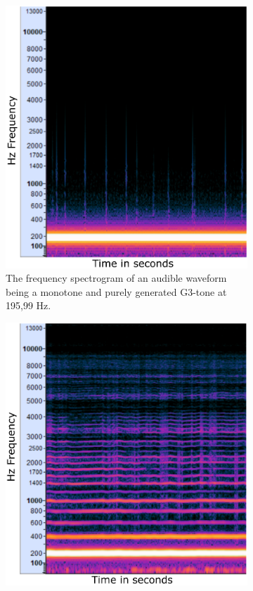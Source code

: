 \begin{figure}[ht!]
	\centering
		\begin{subfigure}[t]{.5\textwidth}
			\centering\captionsetup{width=.9\linewidth}%
			\includegraphics[width=0.9\linewidth]{Assets/Figures/G3_196Hz_PureTone_waveform_spectrogram.pdf}
			\caption{The frequency spectrogram of an audible waveform being a monotone and purely generated \cite{generate_tones} G3-tone at 195,99 Hz.}
			\label{fig:sub:G3_pure_waveform}
		\end{subfigure}%
		\begin{subfigure}[t]{.5\textwidth}
			\centering\captionsetup{width=.9\linewidth}%
			\includegraphics[width=0.9\linewidth]{Assets/Figures/G3_196Hz_HummingWaveform_FrequencySpectrum.pdf}

\end{subfigure}
\end{figure}
